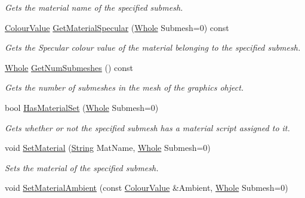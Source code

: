 \begin{DoxyCompactItemize}
\begin{DoxyCompactList}\small\item\em Gets the material name of the specified submesh. \item\end{DoxyCompactList}\item 
\hyperlink{classphys_1_1ColourValue}{ColourValue} \hyperlink{classphys_1_1ActorGraphicsSettings_a2598d7db0dd899417aa3e4d017b8c6ab}{GetMaterialSpecular} (\hyperlink{namespacephys_a460f6bc24c8dd347b05e0366ae34f34a}{Whole} Submesh=0) const 
\begin{DoxyCompactList}\small\item\em Gets the Specular colour value of the material belonging to the specified submesh. \item\end{DoxyCompactList}\item 
\hyperlink{namespacephys_a460f6bc24c8dd347b05e0366ae34f34a}{Whole} \hyperlink{classphys_1_1ActorGraphicsSettings_a550bd94bc063ce629e4c9aa511dbfb79}{GetNumSubmeshes} () const 
\begin{DoxyCompactList}\small\item\em Gets the number of submeshes in the mesh of the graphics ohject. \item\end{DoxyCompactList}\item 
bool \hyperlink{classphys_1_1ActorGraphicsSettings_a7b1948300461014e30e8a295917ae886}{HasMaterialSet} (\hyperlink{namespacephys_a460f6bc24c8dd347b05e0366ae34f34a}{Whole} Submesh=0)
\begin{DoxyCompactList}\small\item\em Gets whether or not the specified submesh has a material script assigned to it. \item\end{DoxyCompactList}\item 
void \hyperlink{classphys_1_1ActorGraphicsSettings_a8954153fe516ddf4e0107348c3af5abc}{SetMaterial} (\hyperlink{namespacephys_aa03900411993de7fbfec4789bc1d392e}{String} MatName, \hyperlink{namespacephys_a460f6bc24c8dd347b05e0366ae34f34a}{Whole} Submesh=0)
\begin{DoxyCompactList}\small\item\em Sets the material of the specified submesh. \item\end{DoxyCompactList}\item 
void \hyperlink{classphys_1_1ActorGraphicsSettings_a93d1c9b229b51b98702b29b8bb5ec4d0}{SetMaterialAmbient} (const \hyperlink{classphys_1_1ColourValue}{ColourValue} \&Ambient, \hyperlink{namespacephys_a460f6bc24c8dd347b05e0366ae34f34a}{Whole} Submesh=0)

\end{DoxyCompactItemize}
